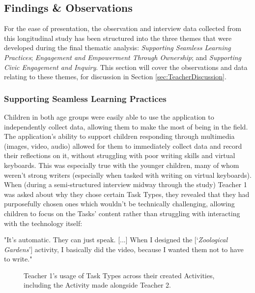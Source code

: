 \subsection{Findings \& Observations}

For the ease of presentation, the observation and interview data collected from this longitudinal study has been structured into the three themes that were developed during the final thematic analysis: \textit{Supporting Seamless Learning Practices}; \textit{Engagement and Empowerment Through Ownership}; and \textit{Supporting Civic Engagement and Inquiry}. This section will cover the observations and data relating to these themes, for discussion in Section \ref{sec:TeacherDiscussion}.

\subsubsection{Supporting Seamless Learning Practices}

Children in both age groups were easily able to use the application to independently collect data, allowing them to make the most of being in the field. The application's ability to support children responding through multimedia (images, video, audio) allowed for them to immediately collect data and record their reflections on it, without struggling with poor writing skills and virtual keyboards. This was especially true with the younger children, many of whom weren't strong writers (especially when tasked with writing on virtual keyboards). When (during a semi-structured interview midway through the study) Teacher 1 was asked about why they chose certain Task Types, they revealed that they had purposefully chosen ones which wouldn't be technically challenging, allowing children to focus on the Tasks' content rather than struggling with interacting with the technology itself: 

\begin{displayquote}
"It’s automatic. They can just speak. [...] When I designed the [‘\textit{Zoological Gardens}’] activity, I basically did the video, because I wanted them not to have to write."
\end{displayquote}

\begin{figure}
    \centering
    \caption[Teacher 1's usage of Task Types across their created Activities]{Teacher 1's usage of Task Types across their created Activities, including the Activity made alongside Teacher 2.}
    \label{fig:TaskTypeUsage}
\end{figure}

